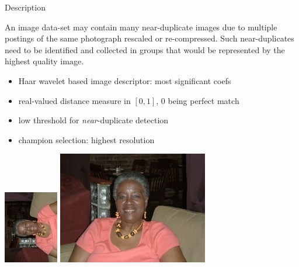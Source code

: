 
\begin{xpsectionbox}{Description}{}

An image data-set may contain many near-duplicate images due to multiple postings of the same photograph rescaled or re-compressed. Such near-duplicates need to be identified and collected in groups that would be represented by the highest quality image.

\begin{minipage}{0.6\linewidth}

\begin{itemize}
	\item Haar wavelet based image descriptor: most significant coefs
	\item real-valued distance measure in $[0,1]$, 0 being perfect match
	\item low threshold for \emph{near}-duplicate detection
	\item champion selection: highest resolution
\end{itemize}
\end{minipage}
\begin{minipage}{0.5\linewidth}

\begin{center}
			\includegraphics[height=0.25\linewidth]{images/NearDupScaleRot}
			\includegraphics[height=0.25\linewidth]{images/NearDupScale}
\end{center}

\end{minipage}
\end{xpsectionbox}

